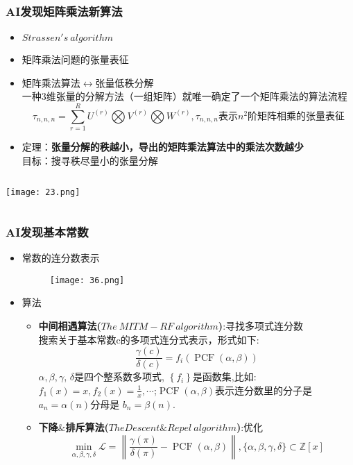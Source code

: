 \documentclass[CJK,aspectratio=169]{beamer}  %
\begin{document}
	\begin{frame}
		\frametitle{AI发现矩阵乘法新算法}
		\begin{itemize}
			\item $Strassen's\ algorithm$
			\item 矩阵乘法问题的张量表征
			\item 矩阵乘法算法$\leftrightarrow$张量低秩分解
			\\一种3维张量的分解方法（一组矩阵）就唯一确定了一个矩阵乘法的算法流程
			$$\tau_{n,n,n}=\sum_{r=1}^{R}U^{(r)}\bigotimes V^{(r)}\bigotimes W^{(r)},\tau_{n,n,n}\text{表示$n^2$阶矩阵相乘的张量表征}$$
			\item 定理：\textbf{张量分解的秩越小，导出的矩阵乘法算法中的乘法次数越少}
			\\目标：搜寻秩尽量小的张量分解
		\end{itemize}
		\begin{columns}
			\begin{column}{0.48\textwidth}
				\texttt{[image: 23.png]}
			\end{column}
			\begin{column}{0.48\textwidth}
				\centering
				\captionsetup{font=tiny}
			\end{column}
		\end{columns}
	\end{frame}
	\begin{frame}
		\frametitle{AI发现基本常数}
		\begin{itemize}
			\item 常数的连分数表示
			\begin{figure}
				\centering
				\texttt{[image: 36.png]}
			\end{figure}
		\end{itemize}
	\end{frame}
	\begin{frame}
		\begin{itemize}
			\item 算法
			\begin{itemize}
				\item \textbf{中间相遇算法($The\ MITM-RF\ algorithm$)}:寻找多项式连分数
				\\搜索关于基本常数c的多项式连分式表示，形式如下:
				$$\frac{\gamma(c)}{\delta(c)}=f_i(\operatorname{PCF}(\alpha, \beta))$$
				$\alpha, \beta, \gamma$, $\delta$是四个整系数多项式, $\left\{f_i\right\}$是函数集,比如:$f_1(x)=x, f_2(x)=\frac{1}{x}, \cdots$;$\operatorname{PCF}(\alpha, \beta)$表示连分数里的分子是$a_n=\alpha(n)$分母是 $b_n=\beta(n)$.
				\item \textbf{下降$\&$排斥算法($The Descent\&Repel\ algorithm$)}:优化
				$$
				\min _{\alpha, \beta, \gamma, \delta} \mathcal{L}=\left\|\frac{\gamma(\pi)}{\delta(\pi)}-\operatorname{PCF}(\alpha, \beta)\right\| ,\{\alpha, \beta, \gamma, \delta\} \subset \mathbb{Z}[x]
				$$
			\end{itemize}
		\end{itemize}
	\end{frame}
\end{document}
